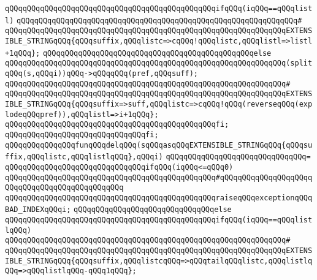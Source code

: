 \verb|qQQqqQQqqQQqqQQqqQQqqQQqqQQqqQQqqQQqqQQqqQQqqQQqifqQQq(iqQQq==qQQqlistl)|\newline
\verb|qQQqqQQqqQQqqQQqqQQqqQQqqQQqqQQqqQQqqQQqqQQqqQQqqQQqqQQqqQQqqQQq#|\newline
\verb|qQQqqQQqqQQqqQQqqQQqqQQqqQQqqQQqqQQqqQQqqQQqqQQqqQQqqQQqqQQqqQQqEXTENSIBLE_STRINGqQQq{qQQqsuffix,qQQqlistc=>cqQQq!qQQqlistc,qQQqlistl=>listl+1qQQq};|\newline
\verb|qQQqqQQqqQQqqQQqqQQqqQQqqQQqqQQqqQQqqQQqqQQqqQQqelse|\newline
\verb|qQQqqQQqqQQqqQQqqQQqqQQqqQQqqQQqqQQqqQQqqQQqqQQqqQQqqQQqqQQqqQQq(splitqQQq(s,qQQqi))qQQq->qQQqqQQq(pref,qQQqsuff);|\newline
\verb|qQQqqQQqqQQqqQQqqQQqqQQqqQQqqQQqqQQqqQQqqQQqqQQqqQQqqQQqqQQqqQQq#|\newline
\verb|qQQqqQQqqQQqqQQqqQQqqQQqqQQqqQQqqQQqqQQqqQQqqQQqqQQqqQQqqQQqqQQqEXTENSIBLE_STRINGqQQq{qQQqsuffix=>suff,qQQqlistc=>cqQQq!qQQq(reverseqQQq(explodeqQQqpref)),qQQqlistl=>i+1qQQq};|\newline
\verb|qQQqqQQqqQQqqQQqqQQqqQQqqQQqqQQqqQQqqQQqqQQqqQQqfi;|\newline
\verb|qQQqqQQqqQQqqQQqqQQqqQQqqQQqqQQqfi;|\newline
\newline
\newline
\verb|qQQqqQQqqQQqqQQqfunqQQqdelqQQq(sqQQqasqQQqEXTENSIBLE_STRINGqQQq{qQQqsuffix,qQQqlistc,qQQqlistlqQQq},qQQqi)|\newline
\verb|qQQqqQQqqQQqqQQqqQQqqQQqqQQqqQQq=|\newline
\verb|qQQqqQQqqQQqqQQqqQQqqQQqqQQqqQQqifqQQq(iqQQq<=qQQq0)|\newline
\verb|qQQqqQQqqQQqqQQqqQQqqQQqqQQqqQQqqQQqqQQqqQQqqQQq#qQQqqQQqqQQqqQQqqQQqqQQqqQQqqQQqqQQqqQQqqQQqqQQq|\newline
\verb|qQQqqQQqqQQqqQQqqQQqqQQqqQQqqQQqqQQqqQQqqQQqqQQqraiseqQQqexceptionqQQqBAD_INDEXqQQqi;|\newline
\verb|qQQqqQQqqQQqqQQqqQQqqQQqqQQqqQQqelse|\newline
\verb|qQQqqQQqqQQqqQQqqQQqqQQqqQQqqQQqqQQqqQQqqQQqqQQqifqQQq(iqQQq==qQQqlistlqQQq)|\newline
\verb|qQQqqQQqqQQqqQQqqQQqqQQqqQQqqQQqqQQqqQQqqQQqqQQqqQQqqQQqqQQqqQQq#|\newline
\verb|qQQqqQQqqQQqqQQqqQQqqQQqqQQqqQQqqQQqqQQqqQQqqQQqqQQqqQQqqQQqqQQqEXTENSIBLE_STRINGqQQq{qQQqsuffix,qQQqlistcqQQq=>qQQqtailqQQqlistc,qQQqlistlqQQq=>qQQqlistlqQQq-qQQq1qQQq};|\newline

